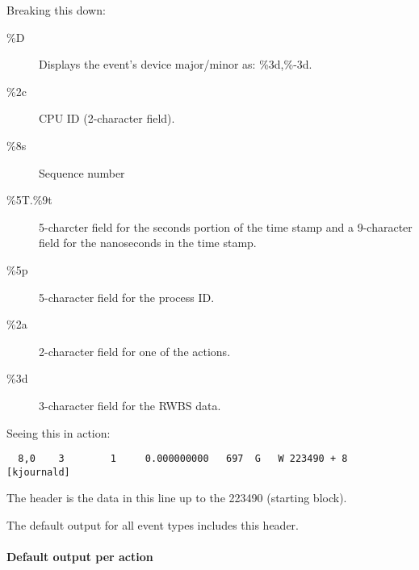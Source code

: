 \documentclass{article}
\begin{document}
Breaking this down:

\begin{description}
  \item[\%D] Displays the event's device major/minor as: \%3d,\%-3d.
  \item[\%2c] CPU ID (2-character field).
  \item[\%8s] Sequence number
  \item[\%5T.\%9t] 5-charcter field for the seconds portion of the
  time stamp and a 9-character field for the nanoseconds in the time stamp.
  \item[\%5p] 5-character field for the process ID.
  \item[\%2a] 2-character field for one of the actions.
  \item[\%3d] 3-character field for the RWBS data.
\end{description}

Seeing this in action:

\begin{verbatim}
  8,0    3        1     0.000000000   697  G   W 223490 + 8 [kjournald]
\end{verbatim}

The header is the data in this line up to the 223490 (starting block). 

The default output for all event types includes this header.

\paragraph{Default output per action}
\end{document}
